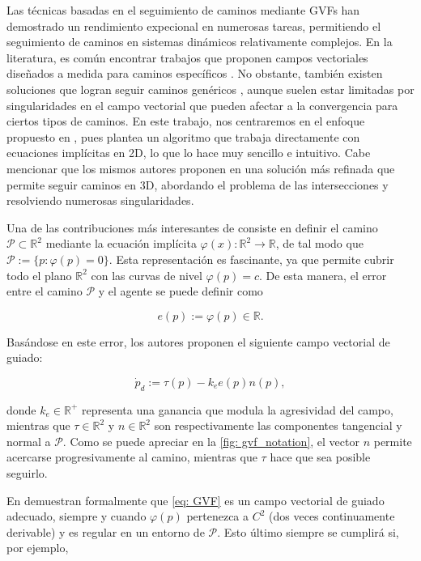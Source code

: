 Las técnicas basadas en el seguimiento de caminos mediante GVFs han demostrado un rendimiento expecional en numerosas tareas, permitiendo el seguimiento de caminos en sistemas dinámicos relativamente complejos. En la literatura, es común encontrar trabajos que proponen campos vectoriales diseñados a medida para caminos específicos \cite{pathfollow_vectorfield}. No obstante, también existen soluciones que logran seguir caminos genéricos \cite{gvf_brasil}, aunque suelen estar limitadas por singularidades en el campo vectorial que pueden afectar a la convergencia para ciertos tipos de caminos. En este trabajo, nos centraremos en el enfoque propuesto en \cite{gvf_classic}, pues plantea un algoritmo que trabaja directamente con ecuaciones implícitas en 2D, lo que lo hace muy sencillo e intuitivo. Cabe mencionar que los mismos autores proponen en \cite{gvf_parametric} una solución más refinada que permite seguir caminos en 3D, abordando el problema de las intersecciones y resolviendo numerosas singularidades.

Una de las contribuciones más interesantes de \cite{gvf_classic} consiste en definir el camino $\mathcal{P} \subset \mathds{R}^2$ mediante la ecuación implícita $\varphi(x) : \mathds{R}^2 \rightarrow \mathds{R}$, de tal modo que $\mathcal{P} := \{ p : \varphi(p) = 0\}$. Esta representación es fascinante, ya que permite cubrir todo el plano $\mathds{R}^2$ con las curvas de nivel $\varphi(p) = c$. De esta manera, el error entre el camino $\mathcal{P}$ y el agente se puede definir como

\begin{equation}
    e(p) := \varphi(p) \in \mathds{R}.
\end{equation}

Basándose en este error, los autores proponen el siguiente campo vectorial de guiado:

\begin{equation} \label{eq: GVF}
    \dot p_d := \tau(p) - k_e e(p) n(p),
\end{equation}

donde $k_e \in \mathds{R}^+$ representa una ganancia que modula la agresividad del campo, mientras que $\tau \in \mathds{R}^2$ y $n \in \mathds{R}^2$ son respectivamente las componentes tangencial y normal a $\mathcal{P}$. Como se puede apreciar en la \autoref{fig: gvf_notation}, el vector $n$ permite acercarse progresivamente al camino, mientras que $\tau$ hace que sea posible seguirlo.

En \cite{gvf_classic} demuestran formalmente que \eqref{eq: GVF} es un campo vectorial de guiado adecuado, siempre y cuando $\varphi (p)$ pertenezca a $C^2$ (dos veces continuamente derivable) y es regular en un entorno de $\mathcal{P}$. Esto último siempre se cumplirá si, por ejemplo,

